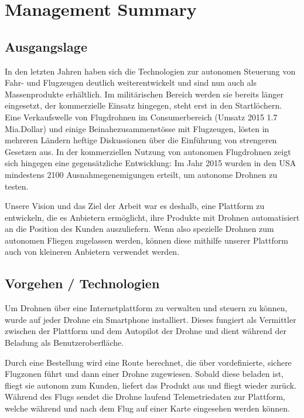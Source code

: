 \newpage
{}
\chapter{Management Summary}
\section*{Ausgangslage}
In den letzten Jahren haben sich die Technologien zur autonomen Steuerung von Fahr- und Flugzeugen deutlich weiterentwickelt und sind nun auch als Massenprodukte erhältlich. Im militärischen Bereich werden sie bereits länger eingesetzt, der kommerzielle Einsatz hingegen, steht erst in den Startlöchern. Eine Verkaufswelle von Flugdrohnen im Consumerbereich (Umsatz 2015 1.7 Mia.Dollar) \cite{droneNZZ} und einige Beinahezusammenstösse mit Flugzeugen, lösten in mehreren Ländern heftige Diskussionen über die Einführung von strengeren Gesetzen aus. In der kommerziellen Nutzung von autonomen Flugdrohnen zeigt sich hingegen eine gegensätzliche Entwicklung: Im Jahr 2015 wurden in den USA mindestens 2100 \cite{perm} Ausnahmegenemigungen erteilt, um autonome Drohnen zu testen. 

Unsere Vision und das Ziel der Arbeit war es deshalb, eine Plattform zu entwickeln, die es Anbietern ermöglicht, ihre Produkte mit Drohnen automatisiert an die Position des Kunden auszuliefern. Wenn also spezielle Drohnen zum autonomen Fliegen zugelassen werden, können diese mithilfe unserer Plattform auch von kleineren Anbietern verwendet werden.

\section*{Vorgehen / Technologien}

Um Drohnen über eine Internetplattform zu verwalten und steuern zu können, wurde auf jeder Drohne ein Smartphone installiert. Dieses fungiert als Vermittler zwischen der Plattform und dem Autopilot der Drohne und dient während der Beladung als Benutzeroberfläche.

Durch eine Bestellung wird eine Route berechnet, die über vordefinierte, sichere Flugzonen führt und dann einer Drohne zugewiesen. Sobald diese beladen ist, fliegt sie autonom zum Kunden, liefert das Produkt aus und fliegt wieder zurück. Während des Flugs sendet die Drohne laufend Telemetriedaten zur Plattform, welche während und nach dem Flug auf einer Karte eingesehen werden können.

